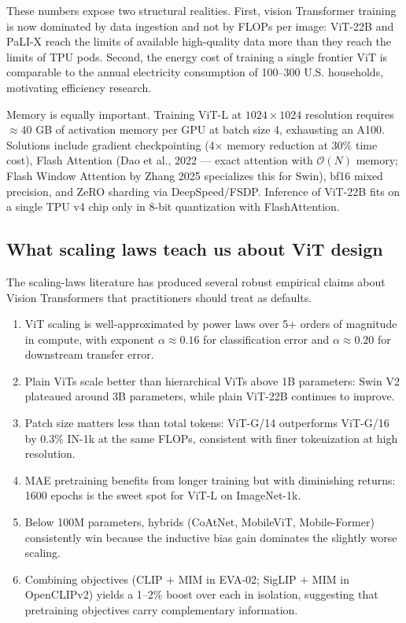 These numbers expose two structural realities. First, vision Transformer training is now dominated by data ingestion and not by FLOPs per image: ViT-22B and PaLI-X reach the limits of available high-quality data more than they reach the limits of TPU pods. Second, the energy cost of training a single frontier ViT is comparable to the annual electricity consumption of 100--300 U.S. households, motivating efficiency research.

Memory is equally important. Training ViT-L at \(1024 \times 1024\) resolution requires \(\approx 40\) GB of activation memory per GPU at batch size 4, exhausting an A100. Solutions include gradient checkpointing (4× memory reduction at 30\% time cost), Flash Attention (Dao et al., 2022 --- exact attention with \(\mathcal{O}(N)\) memory; Flash Window Attention by Zhang 2025 specializes this for Swin), bf16 mixed precision, and ZeRO sharding via DeepSpeed/FSDP. Inference of ViT-22B fits on a single TPU v4 chip only in 8-bit quantization with FlashAttention.

\subsection{What scaling laws teach us about ViT design}\label{what-scaling-laws-teach-us-about-vit-design}

The scaling-laws literature has produced several robust empirical claims about Vision Transformers that practitioners should treat as defaults.

\begin{enumerate}
\def\labelenumi{(\roman{enumi})}
\item
  ViT scaling is well-approximated by power laws over 5+ orders of magnitude in compute, with exponent \(\alpha \approx 0.16\) for classification error and \(\alpha \approx 0.20\) for downstream transfer error.
\item
  Plain ViTs scale better than hierarchical ViTs above 1B parameters: Swin V2 plateaued around 3B parameters, while plain ViT-22B continues to improve.
\item
  Patch size matters less than total tokens: ViT-G/14 outperforms ViT-G/16 by 0.3\% IN-1k at the same FLOPs, consistent with finer tokenization at high resolution.
\item
  MAE pretraining benefits from longer training but with diminishing returns: 1600 epochs is the sweet spot for ViT-L on ImageNet-1k.
\item
  Below 100M parameters, hybrids (CoAtNet, MobileViT, Mobile-Former) consistently win because the inductive bias gain dominates the slightly worse scaling.
\item
  Combining objectives (CLIP + MIM in EVA-02; SigLIP + MIM in OpenCLIPv2) yields a 1--2\% boost over each in isolation, suggesting that pretraining objectives carry complementary information.
\end{enumerate}

